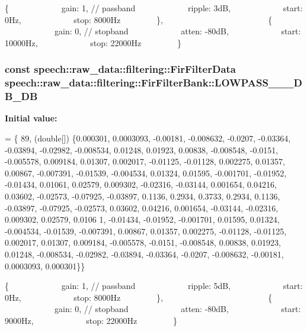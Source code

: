 \{             gain\+: 1, // passband             ripple\+: 3d\+B,             start\+: 0\+Hz,             stop\+: 8000\+Hz         \},                          \{             gain\+: 0, // stopband             atten\+: -\/80d\+B,             start\+: 10000\+Hz,             stop\+: 22000\+Hz         \} \hypertarget{classspeech_1_1raw__data_1_1filtering_1_1FirFilterBank_aa67005c1ebcf970f2826a2d9ee426f1d}{
\subsubsection[{L\+O\+W\+P\+A\+S\+S\+\_\+44100\+\_\+8000\+\_\+5\+D\+B\+\_\+80\+D\+B}]{\setlength{\rightskip}{0pt plus 5cm}const {\bf speech\+::raw\+\_\+data\+::filtering\+::\+Fir\+Filter\+Data} speech\+::raw\+\_\+data\+::filtering\+::\+Fir\+Filter\+Bank\+::\+L\+O\+W\+P\+A\+S\+S\+\_\+\_\+\_\+D\+B\+\_\+D\+B\hspace{0.3cm}{\ttfamily [static]}}}\label{classspeech_1_1raw__data_1_1filtering_1_1FirFilterBank_aa67005c1ebcf970f2826a2d9ee426f1d}
{\bfseries Initial value\+:}
\begin{DoxyCode}
= \{
        89, (\textcolor{keywordtype}{double}[]) \{0.000301, 0.0003093, -0.00181, -0.008632, -0.0207, -0.03364, -0.03894, -0.02982,
                        -0.008534, 0.01248, 0.01923, 0.00838, -0.008548, -0.0151, -0.005578, 0.009184,
                        0.01307, 0.002017, -0.01125, -0.01128, 0.002275, 0.01357, 0.00867, -0.007391,
                        -0.01539, -0.004534, 0.01324, 0.01595, -0.001701, -0.01952, -0.01434, 0.01061,
                        0.02579, 0.009302, -0.02316, -0.03144, 0.001654, 0.04216, 0.03602, -0.02573,
                        -0.07925, -0.03897, 0.1136, 0.2934, 0.3733, 0.2934, 0.1136, -0.03897, -0.07925,
                        -0.02573, 0.03602, 0.04216, 0.001654, -0.03144, -0.02316, 0.009302, 0.02579, 0.0106
      1,
                        -0.01434, -0.01952, -0.001701, 0.01595, 0.01324, -0.004534, -0.01539, -0.007391,
                        0.00867, 0.01357, 0.002275, -0.01128, -0.01125, 0.002017, 0.01307, 0.009184,
                        -0.005578, -0.0151, -0.008548, 0.00838, 0.01923, 0.01248, -0.008534, -0.02982,
                        -0.03894, -0.03364, -0.0207, -0.008632, -0.00181, 0.0003093, 0.000301\}\}
\end{DoxyCode}
\{             gain\+: 1, // passband             ripple\+: 5d\+B,             start\+: 0\+Hz,             stop\+: 8000\+Hz         \},                          \{             gain\+: 0, // stopband             atten\+: -\/80d\+B,             start\+: 9000\+Hz,             stop\+: 22000\+Hz         \} 

